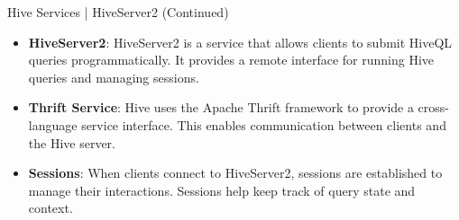 \begin{frame}{Hive Services | HiveServer2 (Continued)}
	\begin{itemize}
		\item \textbf{HiveServer2}: HiveServer2 is a service that allows clients to submit HiveQL queries programmatically. It provides a remote interface for running Hive queries and managing sessions.
		\item \textbf{Thrift Service}: Hive uses the Apache Thrift framework to provide a cross-language service interface. This enables communication between clients and the Hive server.
		\item \textbf{Sessions}: When clients connect to HiveServer2, sessions are established to manage their interactions. Sessions help keep track of query state and context.
	\end{itemize}
\end{frame}

